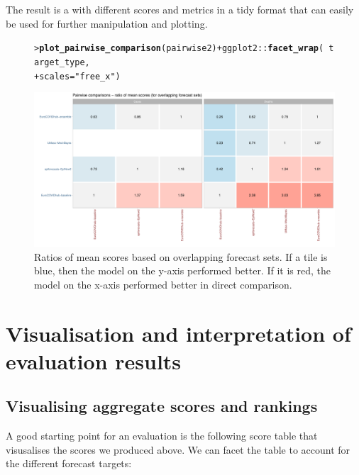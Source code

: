 \documentclass[article,shortnames]{jss}\usepackage[]{graphicx}\usepackage[]{color}
\makeatletter
\def\maxwidth{ %
  \ifdim\Gin@nat@width>\linewidth
    \linewidth
  \else
    \Gin@nat@width
  \fi
}
\newcommand{\hlstr}[1]{\textcolor[rgb]{0.192,0.494,0.8}{#1}}%
\newcommand{\hlopt}[1]{\textcolor[rgb]{0,0,0}{#1}}%
\newcommand{\hlstd}[1]{\textcolor[rgb]{0.345,0.345,0.345}{#1}}%
\newcommand{\hlkwc}[1]{\textcolor[rgb]{0.333,0.667,0.333}{#1}}%
\newcommand{\hlkwd}[1]{\textcolor[rgb]{0.737,0.353,0.396}{\textbf{#1}}}%
\newenvironment{kframe}{%
 \def\at@end@of@kframe{}%
 \ifinner\ifhmode%
  \def\at@end@of@kframe{\end{minipage}}%
  \begin{minipage}{\columnwidth}%
 \fi\fi%
 \def\FrameCommand##1{\hskip\@totalleftmargin \hskip-\fboxsep
 \colorbox{shadecolor}{##1}\hskip-\fboxsep
     \hskip-\linewidth \hskip-\@totalleftmargin \hskip\columnwidth}%
 \MakeFramed {\advance\hsize-\width
   \@totalleftmargin\z@ \linewidth\hsize
   \@setminipage}}%
 {\par\unskip\endMakeFramed%
 \at@end@of@kframe}
\newenvironment{knitrout}{}{} %
\makeatother
\begin{document}
The result is a  with different scores and metrics in a tidy format that can easily be used for further manipulation and plotting. 

\begin{figure}[h!]
\centering
\begin{knitrout}
\color{fgcolor}\begin{kframe}
\begin{alltt}
\hlstd{> }\hlkwd{plot_pairwise_comparison}\hlstd{(pairwise2)} \hlopt{+} \hlstd{ggplot2}\hlopt{::}\hlkwd{facet_wrap}\hlstd{(}\hlopt{~}\hlstd{target_type,}
\hlstd{+ }    \hlkwc{scales} \hlstd{=} \hlstr{"free_x"}\hlstd{)}
\end{alltt}
\end{kframe}
\includegraphics[width=\maxwidth]{plots/plot-pairwise-plot-1} 
\end{knitrout}
\caption{\label{fig:pairwise-comparison} Ratios of mean scores based on overlapping forecast sets. If a tile is blue, then the model on the y-axis performed better. If it is red, the model on the x-axis performed better in direct comparison. }
\end{figure}

\section{Visualisation and interpretation of evaluation results}

\subsection{Visualising aggregate scores and rankings}
A good starting point for an evaluation is the following score table that visusalises the scores we produced above. We can facet the table to account for the different forecast targets: 
\end{document}
